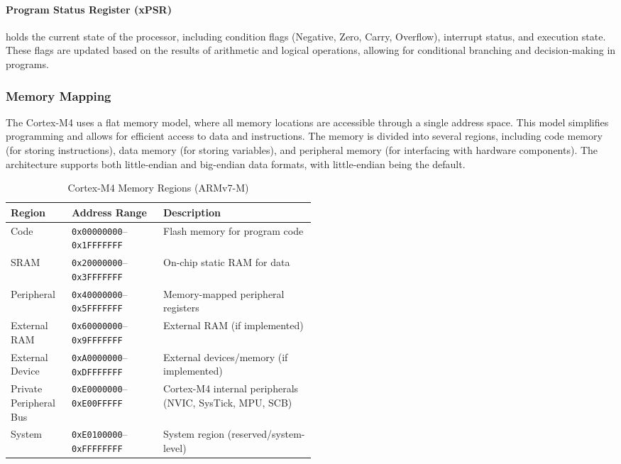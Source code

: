 \paragraph{Program Status Register (xPSR)}
holds the current state of the processor, including condition flags (Negative, Zero, Carry, Overflow), interrupt status, and execution state. These flags are updated based on the results of arithmetic and logical operations, allowing for conditional branching and decision-making in programs.

\subsubsection{Memory Mapping}
The Cortex-M4 uses a flat memory model, where all memory locations are accessible through a single address space. This model simplifies programming and allows for efficient access to data and instructions. The memory is divided into several regions, including code memory (for storing instructions), data memory (for storing variables), and peripheral memory (for interfacing with hardware components). The architecture supports both little-endian and big-endian data formats, with little-endian being the default.
\begin{table}[H]
\centering
\caption{Cortex-M4 Memory Regions (ARMv7-M)}
\begin{tabularx}{\linewidth}{@{}p{0.20\linewidth}p{0.30\linewidth}X@{}}
\toprule
\textbf{Region} & \textbf{Address Range} & \textbf{Description} \\
\midrule
Code            & \texttt{0x00000000}--\texttt{0x1FFFFFFF} & Flash memory for program code \\[0.5ex]
SRAM            & \texttt{0x20000000}--\texttt{0x3FFFFFFF} & On-chip static RAM for data \\[0.5ex]
Peripheral      & \texttt{0x40000000}--\texttt{0x5FFFFFFF} & Memory-mapped peripheral registers \\[0.5ex]
External RAM    & \texttt{0x60000000}--\texttt{0x9FFFFFFF} & External RAM (if implemented) \\[0.5ex]
External Device & \texttt{0xA0000000}--\texttt{0xDFFFFFFF} & External devices/memory (if implemented) \\[0.5ex]
Private Peripheral Bus & \texttt{0xE0000000}--\texttt{0xE00FFFFF} & Cortex-M4 internal peripherals  (NVIC, SysTick, MPU, SCB)\\
System          & \texttt{0xE0100000}--\texttt{0xFFFFFFFF} & System region (reserved/system-level) \\
\bottomrule
\end{tabularx}
\end{table}


